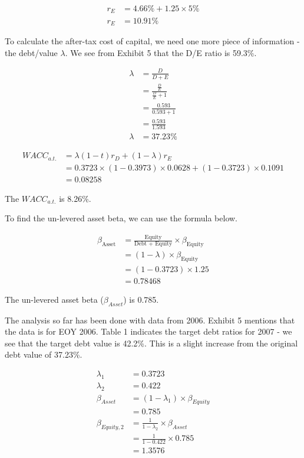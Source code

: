 \documentclass[letterpaper]{article}
\begin{document}
\begin{align*}
r_E &= 4.66\% + 1.25 \times 5\% \\
r_E &= 10.91\%
\end{align*}

To calculate the after-tax cost of capital, we need one more piece of information - the debt/value $\lambda$. We see from Exhibit 5 that the D/E ratio is 59.3\%.

\begin{align*}
    \lambda &= \frac{D}{D+E} \\
            &= \frac{\frac{D}{E}}{\frac{D}{E} + 1} \\
            &= \frac{0.593}{0.593 + 1} \\
            &= \frac{0.593}{1.593} \\
    \lambda &= 37.23\%
\end{align*}

\begin{align*}
WACC_{a.t.} &= \lambda (1-t) r_D + (1-\lambda)r_E \\
            &= 0.3723 \times (1 - 0.3973) \times 0.0628 + (1 - 0.3723) \times 0.1091 \\
            &= 0.08258
\end{align*}

The $WACC_{a.t.}$ is 8.26\%.

To find the un-levered asset beta, we can use the formula below.

\begin{align*}
\beta_{\text{Asset}} &= \frac{\text{Equity}}{\text{Debt + Equity}}\times \beta_{\text{Equity}} \\
                    &= (1 - \lambda) \times \beta_{\text{Equity}} \\
                    &= (1 - 0.3723) \times 1.25 \\
                    &= 0.78468
\end{align*}

The un-levered asset beta ($\beta_{Asset}$) is 0.785.

The analysis so far has been done with data from 2006. Exhibit 5 mentions that the data is for EOY 2006. Table 1 indicates the target debt ratios for 2007 - we see that the target debt value is 42.2\%. This is a slight increase from the original debt value of 37.23\%.

\begin{align*}
\lambda_{1} &= 0.3723 \\
\lambda_{2} &= 0.422  \\
\beta_{Asset} &= (1 - \lambda_{1}) \times \beta_{Equity} \\
            &= 0.785 \\
\beta_{Equity,2} &= \frac{1}{1-\lambda_{2}} \times \beta_{Asset} \\
                &= \frac{1}{1-0.422} \times 0.785 \\
                &= 1.3576
\end{align*}
\end{document}
